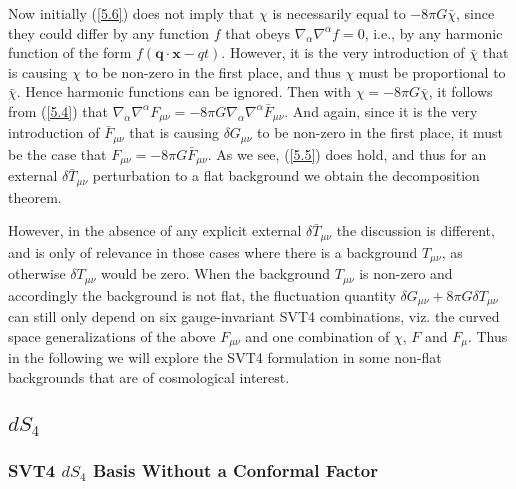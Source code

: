 Now initially (\ref{5.6})  does not imply that $\chi$ is necessarily equal to $-8\pi G\bar{\chi}$, since they could differ by any function $f$ that obeys $\nabla_{\alpha}\nabla^{\alpha}f=0$, i.e., by any harmonic function of the form $f(\mathbf{q}\cdot\mathbf{x}-q t)$. However, it is the very introduction of $\bar{\chi}$ that is causing $\chi$ to be non-zero in the first place, and thus $\chi$ must be proportional to $\bar{\chi}$. Hence harmonic functions can be ignored. Then with  $\chi=-8\pi G\bar{\chi}$, it follows from (\ref{5.4}) that $\nabla_{\alpha}\nabla^{\alpha}F_{\mu\nu}=-8 \pi G\nabla_{\alpha}\nabla^{\alpha}\bar{F}_{\mu\nu}$. And again, since it is the very introduction of $\bar{F}_{\mu\nu}$ that is causing $\delta G_{\mu\nu}$ to be non-zero in the first place, it must be the case that $F_{\mu\nu}=-8 \pi G\bar{F}_{\mu\nu}$. As we see, (\ref{5.5}) does hold, and thus for an external $\delta \bar{T}_{\mu\nu}$ perturbation to a flat background we  obtain the decomposition theorem.

However, in the absence of any explicit external $\delta \bar{T}_{\mu\nu}$ the discussion is different, and is only of relevance in those cases where there is a background $T_{\mu\nu}$, as otherwise $\delta T_{\mu\nu}$ would be zero. When the background $T_{\mu\nu}$ is non-zero and accordingly the background is not flat, the fluctuation quantity $\delta G_{\mu\nu}+8\pi G \delta T_{\mu\nu}$ can still only depend on six gauge-invariant SVT4 combinations, viz. the curved space generalizations of the above $F_{\mu\nu}$ and one combination of $\chi$, $F$ and $F_{\mu}$. Thus in the following we will explore the SVT4 formulation in some non-flat backgrounds that are of cosmological interest.
\subsection{$dS_4$}
\label{ss:ds4_svt4}

\subsubsection{SVT4 $dS_4$ Basis Without a Conformal Factor}
\label{sss:svt4_without_conformal_factor}

